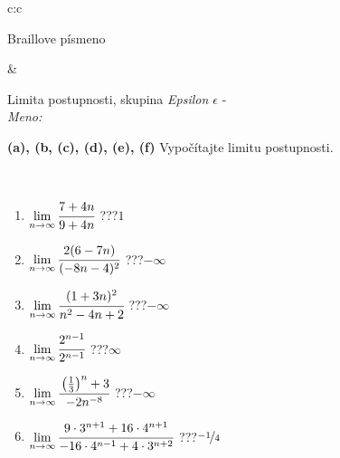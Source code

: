 \documentclass[10pt]{report}
\begin{document}
\begin{tabular}{c:c}
\begin{minipage}[c][104.5mm][t]{0.5\linewidth}
\begin{center}
\begin{minipage}{0.20\linewidth}
\begin{center}
{\small Braillove písmeno}
\end{center}
\end{minipage}
\end{center}
\end{minipage}
&
\begin{minipage}[c][104.5mm][t]{0.5\linewidth}
\begin{center}
\vspace{5mm}
{\huge Limita postupnosti, skupina \textit{Epsilon $\epsilon$} -}\\[5mm]
\textit{Meno:}\phantom{xxxxxxxxxxxxxxxxxxxxxxxxxxxxxxxxxxxxxxxxxxxxxxxxxxxxxxxxxxxxxxxxx}\\[5mm]
\begin{minipage}{0.95\linewidth}
\begin{center}
{
\textbf{(a), (b, (c), (d), (e), (f)} Vypočítajte limitu postupnosti. \\[-1mm]
\phantom{x}
}
\end{center}
\end{minipage}
\\[1mm]
\begin{minipage}{0.79\linewidth}
\begin{center}
\begin{varwidth}{\linewidth}
\setlength{\itemsep}{0pt}
\begin{enumerate}
\normalsize
\item $\lim\limits_{n\to\infty}\cfrac{7+4n}{9+4n}$\quad \dotfill\; ???\;\dotfill \quad $1$
\item $\lim\limits_{n\to\infty}\cfrac{2(6-7n)}{(-8n-4)^2}$\quad \dotfill\; ???\;\dotfill \quad $-\infty$
\item $\lim\limits_{n\to\infty}\cfrac{(1+3n)^2}{n^2-4n+2}$\quad \dotfill\; ???\;\dotfill \quad $-\infty$
\item $\lim\limits_{n\to\infty}\cfrac{2^{n-1}}{2^{n-1}}$\quad \dotfill\; ???\;\dotfill \quad $\infty$
\item $\lim\limits_{n\to\infty}\cfrac{\left(\frac{1}{3}\right)^n +3}{-2n^{-8}}$\quad \dotfill\; ???\;\dotfill \quad $-\infty$
\item $\lim\limits_{n\to\infty}\cfrac{9\cdot 3^{n+1}+16\cdot 4^{n+1}}{-16\cdot 4^{n-1}+4\cdot 3^{n+2}}$\quad \dotfill\; ???\;\dotfill \quad $\nicefrac{-1}{4}$
\end{enumerate}
\end{varwidth}
\end{center}
\end{minipage}
\begin{minipage}{0.20\linewidth}

\end{minipage}
\end{center}
\end{minipage}
\end{tabular}
\end{document}
